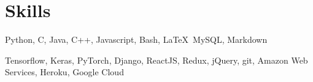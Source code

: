 
\section{Skills}
Python, C, Java, C++, Javascript, Bash, \LaTeX\, MySQL, Markdown
\sectionsep

Tensorflow, Keras, PyTorch, Django, ReactJS, Redux, jQuery, git, Amazon Web Services, Heroku, Google Cloud
\sectionsep